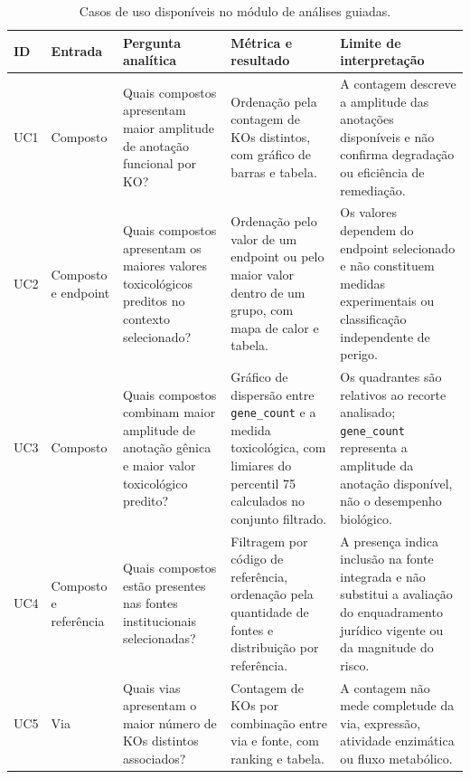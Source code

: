 \begin{table}[htbp]
\centering
\caption{Casos de uso disponíveis no módulo de análises guiadas.}
\label{tab:c2-guided-use-cases}
\scriptsize
\begin{tabularx}{\textwidth}{
    @{}
    p{0.65cm}
    p{1.65cm}
    p{3.45cm}
    p{4.35cm}
    X
    @{}
}
\toprule
\textbf{ID}
& \textbf{Entrada}
& \textbf{Pergunta analítica}
& \textbf{Métrica e resultado}
& \textbf{Limite de interpretação} \\
\midrule

UC1
& Composto
& Quais compostos apresentam maior amplitude de anotação funcional por KO?
& Ordenação pela contagem de KOs distintos, com gráfico de barras e tabela.
& A contagem descreve a amplitude das anotações disponíveis e não confirma
degradação ou eficiência de remediação. \\

UC2
& Composto e endpoint
& Quais compostos apresentam os maiores valores toxicológicos preditos no
contexto selecionado?
& Ordenação pelo valor de um endpoint ou pelo maior valor dentro de um grupo,
com mapa de calor e tabela.
& Os valores dependem do endpoint selecionado e não constituem medidas
experimentais ou classificação independente de perigo. \\

UC3
& Composto
& Quais compostos combinam maior amplitude de anotação gênica e maior valor
toxicológico predito?
& Gráfico de dispersão entre \texttt{gene\_count} e a medida toxicológica,
com limiares do percentil 75 calculados no conjunto filtrado.
& Os quadrantes são relativos ao recorte analisado; \texttt{gene\_count}
representa a amplitude da anotação disponível, não o desempenho biológico. \\

UC4
& Composto e referência
& Quais compostos estão presentes nas fontes institucionais selecionadas?
& Filtragem por código de referência, ordenação pela quantidade de fontes e
distribuição por referência.
& A presença indica inclusão na fonte integrada e não substitui a avaliação
do enquadramento jurídico vigente ou da magnitude do risco. \\

UC5
& Via
& Quais vias apresentam o maior número de KOs distintos associados?
& Contagem de KOs por combinação entre via e fonte, com ranking e tabela.
& A contagem não mede completude da via, expressão, atividade enzimática ou
fluxo metabólico. \\


\end{tabularx}
\end{table}
